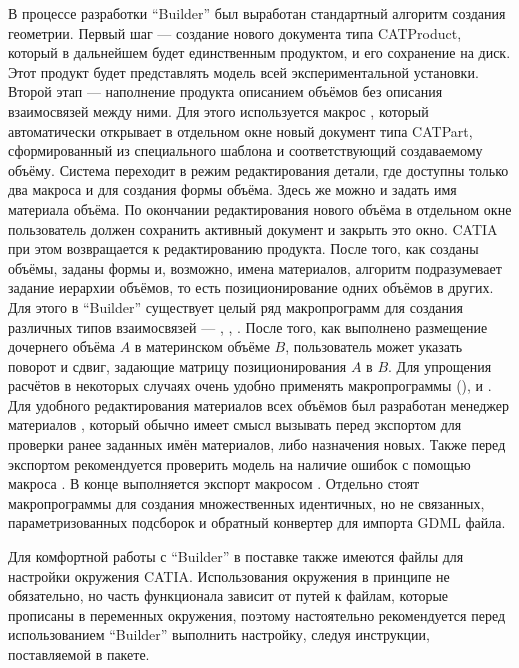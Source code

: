 В процессе разработки ``Builder'' был выработан стандартный алгоритм создания геометрии. Первый шаг --- создание нового документа типа CATProduct, который в дальнейшем будет единственным продуктом, и его сохранение на диск. Этот продукт будет представлять модель всей экспериментальной установки. Второй этап --- наполнение продукта описанием объёмов без описания взаимосвязей между ними. Для этого используется макрос , который автоматически открывает в отдельном окне новый документ типа CATPart, сформированный из специального шаблона и соответствующий создаваемому объёму. Система переходит в режим редактирования детали, где доступны только два макроса  и  для создания формы объёма. Здесь же можно и задать имя материала объёма. По окончании редактирования нового объёма в отдельном окне пользователь должен сохранить активный документ и закрыть это окно. CATIA при этом возвращается к редактированию продукта. После того, как созданы объёмы, заданы формы и, возможно, имена материалов, алгоритм подразумевает задание иерархии объёмов, то есть позиционирование одних объёмов в других. Для этого в ``Builder'' существует целый ряд макропрограмм для создания различных типов взаимосвязей --- , , . После того, как выполнено размещение дочернего объёма $A$ в материнском объёме $B$, пользователь может указать поворот и сдвиг, задающие матрицу позиционирования $A$ в $B$. Для упрощения расчётов в некоторых случаях очень удобно применять макропрограммы  (),  и . Для удобного редактирования материалов всех объёмов был разработан менеджер материалов , который обычно имеет смысл вызывать перед экспортом для проверки ранее заданных имён материалов, либо назначения новых. Также перед экспортом рекомендуется проверить модель на наличие ошибок с помощью макроса . В конце выполняется экспорт макросом . Отдельно стоят макропрограммы  для создания множественных идентичных, но не связанных, параметризованных подсборок и обратный конвертер  для импорта GDML файла.

Для комфортной работы с ``Builder'' в поставке также имеются файлы для настройки окружения CATIA. Использования окружения в принципе не обязательно, но часть функционала зависит от путей к файлам, которые прописаны в переменных окружения, поэтому настоятельно рекомендуется перед использованием ``Builder'' выполнить настройку, следуя инструкции, поставляемой в пакете.

